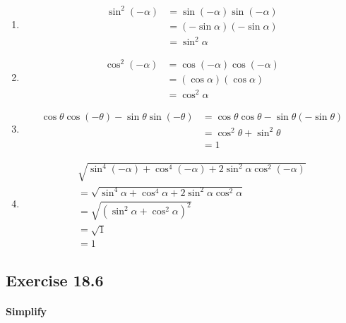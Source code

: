 \documentclass{article}
\begin{document}
\begin{enumerate}[label=\arabic*)]
  \item
        \[
        \begin{aligned}
          \sin^{2}(-\alpha) &= \sin(-\alpha) \sin(-\alpha) \\
                            &= (-\sin\alpha)(-\sin\alpha) \\
                            &= \sin^{2}\alpha
        \end{aligned}
        \]
  \item
        \[
        \begin{aligned}
          \cos^{2}(-\alpha) &= \cos(-\alpha) \cos(-\alpha) \\
                            &= (\cos\alpha)(\cos\alpha) \\
                            &= \cos^{2}\alpha
        \end{aligned}
        \]
  \item
        \[
        \begin{aligned}
          \cos\theta \cos(-\theta) - \sin\theta \sin(-\theta) &= \cos\theta \cos\theta - \sin\theta(-\sin\theta) \\
                            &= \cos^{2}\theta + \sin^{2}\theta \\
                            &= 1
        \end{aligned}
        \]
  \item
        \[
        \begin{aligned}
          \sqrt{\sin^{4}(-\alpha) + \cos^{4}(-\alpha) + 2\sin^{2}\alpha\cos^{2}(-\alpha)} \\
          = \sqrt{\sin^{4}\alpha + \cos^{4}\alpha + 2\sin^{2}\alpha\cos^{2}\alpha} \\
          = \sqrt{(\sin^{2}\alpha+\cos^{2}\alpha)^{2}} \\
          = \sqrt{1} \\
          = 1
        \end{aligned}
        \]
\end{enumerate}

\subsection {Exercise 18.6}

\paragraph{Simplify}
\end{document}
